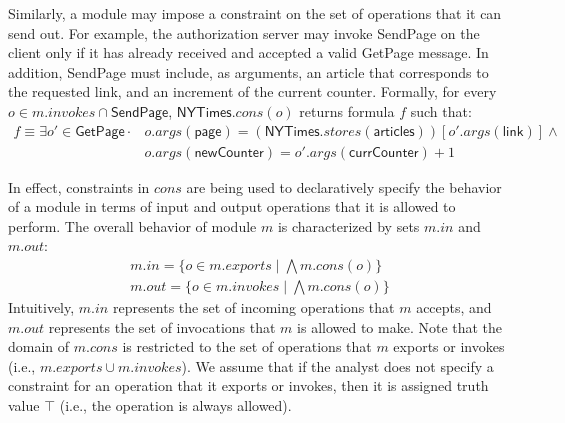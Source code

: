 Similarly, a module may impose a constraint on the set of operations
that it can send out. For example, the authorization server may invoke
\textsf{SendPage} on the client only if it has already received and
accepted a valid \textsf{GetPage} message. In addition,
\textsf{SendPage} must include, as arguments, an article that
corresponds to the requested link, and an increment of the current
counter. Formally, for every $o \in m.invokes \cap \textsf{SendPage}$,
$\textsf{NYTimes}.cons(o)$ returns formula $f$ such that:
\begin{align*}
f \equiv \exists o' \in \textsf{GetPage} \cdot & o.args(\textsf{page}) =
(\textsf{NYTimes}.stores(\textsf{articles}))[o'.args(\textsf{link})]
\land \\
& o.args(\textsf{newCounter}) = o'.args(\textsf{currCounter}) + 1
\end{align*}

In effect, constraints in $cons$ are being used to
declaratively specify the behavior of a module in terms of input and
output operations that it is allowed to perform. The overall behavior
of module $m$ is characterized by sets $m.in$ and $m.out$:
\begin{align*}
m.in = \{ o \in m.exports \;|\; \bigwedge m.cons(o) \} \\
m.out = \{ o \in m.invokes \;|\; \bigwedge m.cons(o) \}
\end{align*}
Intuitively, $m.in$ represents the set of incoming operations that $m$
accepts, and $m.out$ represents the set of invocations that $m$ is
allowed to make. Note that the domain of $m.cons$ is restricted to
the set of operations that $m$ exports or invokes (i.e., $m.exports
\cup m.invokes$). We assume that if the analyst does not specify a
constraint for an operation that it exports or invokes,
then it is assigned truth value $\top$ (i.e., the operation is always
allowed).


